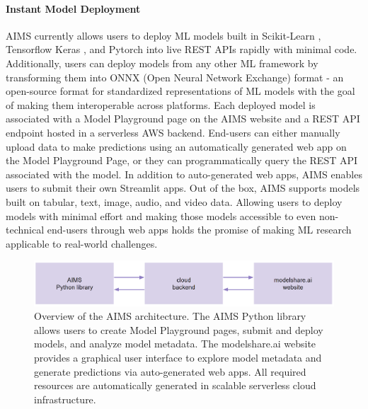 \paragraph{Instant Model Deployment} AIMS currently allows users to deploy ML models built in Scikit-Learn \citep{pedregosa_scikit-learn:_2011}, Tensorflow Keras \citep{abadi_tensorflow_2016, chollet_keras_2015}, and Pytorch \citep{paszke_pytorch_2019} into live REST APIs rapidly with minimal code. Additionally, users can deploy models from any other ML framework by transforming them into ONNX (Open Neural Network Exchange) format - an open-source format for standardized representations of ML models with the goal of making them interoperable across platforms. Each deployed model is associated with a Model Playground page on the AIMS website and a REST API endpoint hosted in a serverless AWS backend. End-users can either manually upload data to make predictions using an automatically generated web app on the Model Playground Page, or they can programmatically query the REST API associated with the model. In addition to auto-generated web apps, AIMS enables users to submit their own Streamlit apps. Out of the box, AIMS supports models built on tabular, text, image, audio, and video data. Allowing users to deploy models with minimal effort and making those models accessible to even non-technical end-users through web apps holds the promise of making ML research applicable to real-world challenges.



\begin{figure}
  \centering
  \includegraphics[width=1\textwidth]{figures/fig_aims_architecture.png}
  \caption{Overview of the AIMS architecture. The AIMS Python library allows users to create Model Playground pages, submit and deploy models, and analyze model metadata. The modelshare.ai website provides a graphical user interface to explore model metadata and generate predictions via auto-generated web apps. All required resources are automatically generated in scalable serverless cloud infrastructure.}
  \label{fig:fig_architecture}
\end{figure}


